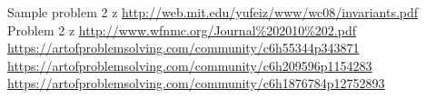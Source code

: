 
 Sample problem 2 z \url{http://web.mit.edu/yufeiz/www/wc08/invariants.pdf} \\
 Problem 2 z \url{http://www.wfnmc.org/Journal%202010%202.pdf} \\
 \url{https://artofproblemsolving.com/community/c6h55344p343871} \\
 \url{https://artofproblemsolving.com/community/c6h209596p1154283} \\
 \url{https://artofproblemsolving.com/community/c6h1876784p12752893} \\


